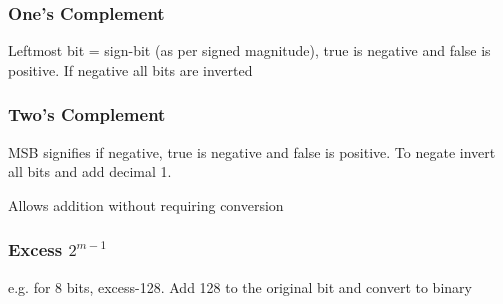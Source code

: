 \subsubsection{One's Complement}
Leftmost bit = sign-bit (as per signed magnitude), true is negative and false is positive. If negative all bits are inverted

\subsubsection{Two's Complement}
MSB signifies if negative, true is negative and false is positive. To negate invert all bits and add decimal 1.
\begin{leftbar}
	Allows addition without requiring conversion	
\end{leftbar}


\subsubsection{Excess $2^{m-1}$}
e.g. for 8 bits, excess-128. Add 128 to the original bit and convert to binary